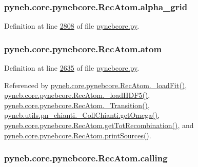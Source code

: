 \hypertarget{classpyneb_1_1core_1_1pynebcore_1_1_rec_atom_ad253222149ed56462daddaa2b9287cbb}{
\subsubsection[{alpha\-\_\-grid}]{\setlength{\rightskip}{0pt plus 5cm}pyneb.\-core.\-pynebcore.\-Rec\-Atom.\-alpha\-\_\-grid}}\label{classpyneb_1_1core_1_1pynebcore_1_1_rec_atom_ad253222149ed56462daddaa2b9287cbb}


Definition at line \hyperlink{pynebcore_8py_source_l02808}{2808} of file \hyperlink{pynebcore_8py_source}{pynebcore.\-py}.

\hypertarget{classpyneb_1_1core_1_1pynebcore_1_1_rec_atom_a1a2aa175da6b5b8847f409e37437e3d3}{
\subsubsection[{atom}]{\setlength{\rightskip}{0pt plus 5cm}pyneb.\-core.\-pynebcore.\-Rec\-Atom.\-atom}}\label{classpyneb_1_1core_1_1pynebcore_1_1_rec_atom_a1a2aa175da6b5b8847f409e37437e3d3}


Definition at line \hyperlink{pynebcore_8py_source_l02635}{2635} of file \hyperlink{pynebcore_8py_source}{pynebcore.\-py}.



Referenced by \hyperlink{pynebcore_8py_source_l02754}{pyneb.\-core.\-pynebcore.\-Rec\-Atom.\-\_\-load\-Fit()}, \hyperlink{pynebcore_8py_source_l02714}{pyneb.\-core.\-pynebcore.\-Rec\-Atom.\-\_\-load\-H\-D\-F5()}, \hyperlink{pynebcore_8py_source_l02812}{pyneb.\-core.\-pynebcore.\-Rec\-Atom.\-\_\-\-Transition()}, \hyperlink{pn__chianti_8py_source_l00507}{pyneb.\-utils.\-pn\-\_\-chianti.\-\_\-\-Coll\-Chianti.\-get\-Omega()}, \hyperlink{pynebcore_8py_source_l02851}{pyneb.\-core.\-pynebcore.\-Rec\-Atom.\-get\-Tot\-Recombination()}, and \hyperlink{pynebcore_8py_source_l02912}{pyneb.\-core.\-pynebcore.\-Rec\-Atom.\-print\-Sources()}.

\hypertarget{classpyneb_1_1core_1_1pynebcore_1_1_rec_atom_a82ec425ebba32b73a5d9ae52717d47c4}{
\subsubsection[{calling}]{\setlength{\rightskip}{0pt plus 5cm}pyneb.\-core.\-pynebcore.\-Rec\-Atom.\-calling}}\label{classpyneb_1_1core_1_1pynebcore_1_1_rec_atom_a82ec425ebba32b73a5d9ae52717d47c4}


